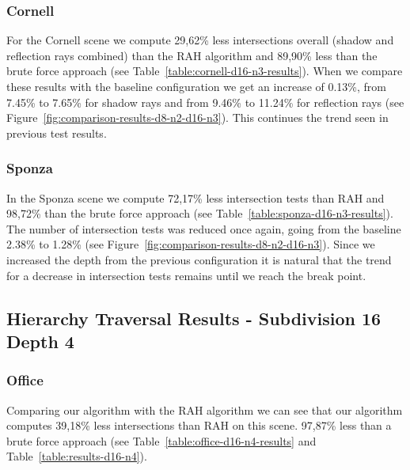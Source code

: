 \subsubsection{Cornell}

For the Cornell scene we compute 29,62\% less intersections overall (shadow and reflection rays combined) than the RAH algorithm and 89,90\% less than the brute force approach (see Table~\ref{table:cornell-d16-n3-results}). When we compare these results with the baseline configuration we get an increase of 0.13\%, from 7.45\% to 7.65\% for shadow rays and from 9.46\% to 11.24\% for reflection rays (see Figure~\ref{fig:comparison-results-d8-n2-d16-n3}). This continues the trend seen in previous test results.

\subsubsection{Sponza}

In the Sponza scene we compute 72,17\% less intersection tests than RAH and 98,72\% than the brute force approach (see Table~\ref{table:sponza-d16-n3-results}). The number of intersection tests was reduced once again, going from the baseline 2.38\% to 1.28\% (see Figure~\ref{fig:comparison-results-d8-n2-d16-n3}). Since we increased the depth from the previous configuration it is natural that the trend for a decrease in intersection tests remains until we reach the break point.


\pagebreak
\subsection{Hierarchy Traversal Results - Subdivision 16 Depth 4}

\subsubsection{Office}


Comparing our algorithm with the RAH algorithm we can see that our algorithm computes 39,18\% less intersections than RAH on this scene. 97,87\% less than a brute force approach (see Table~\ref{table:office-d16-n4-results} and Table~\ref{table:results-d16-n4}).

    
